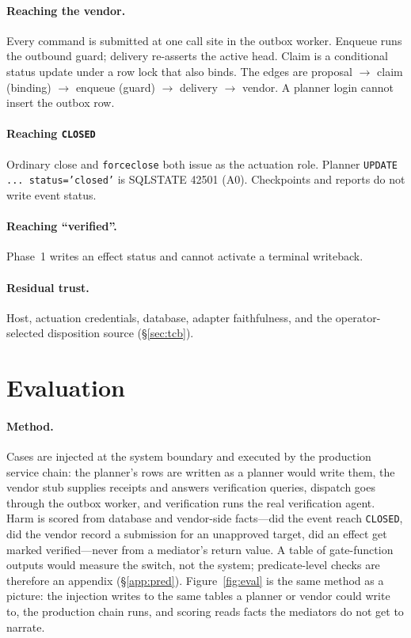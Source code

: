\documentclass[acmsmall,manuscript,review,anonymous]{acmart}
\renewcommand{\_}{\discretionary{\textunderscore}{}{\textunderscore}}
\begin{document}
\paragraph{Reaching the vendor.}
Every command is submitted at one call site in the outbox worker.
Enqueue runs the outbound guard; delivery re-asserts the active head.
Claim is a conditional status update under a row lock that also binds.
The edges are proposal $\rightarrow$ claim (binding) $\rightarrow$
enqueue (guard) $\rightarrow$ delivery $\rightarrow$ vendor. A planner
login cannot insert the outbox row.

\paragraph{Reaching \texttt{CLOSED}}
{\sloppy
Ordinary close and \texttt{force\_close} both issue as the actuation
role. Planner \texttt{UPDATE ... status='closed'} is {SQLSTATE} 42501
(A0). Checkpoints and reports do not write event status.\par}

\paragraph{Reaching ``verified''.}
Phase~1 writes an effect status and cannot activate a terminal
writeback.

\paragraph{Residual trust.}
Host, actuation credentials, database, adapter faithfulness, and the
operator-selected disposition source (\S\ref{sec:tcb}).

\section{Evaluation}
\label{sec:eval}

\paragraph{Method.}
Cases are injected at the system boundary and executed by the production
service chain: the planner's rows are written as a planner would write them, the
vendor stub supplies receipts and answers verification queries, dispatch goes
through the outbox worker, and verification runs the real verification agent.
Harm is scored from database and vendor-side facts---did the event reach
\texttt{CLOSED}, did the vendor record a submission for an unapproved target,
did an effect get marked verified---never from a mediator's return value.
A table of gate-function outputs would measure the switch, not the
system; predicate-level checks are therefore an appendix
(\S\ref{app:pred}). Figure~\ref{fig:eval} is the same method as a picture:
the injection writes to the same tables a planner or vendor could write to, the
production chain runs, and scoring reads facts the mediators do not get to
narrate.
\end{document}
